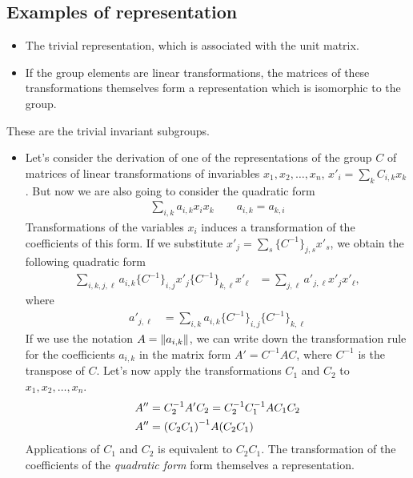 \subsection{Examples of representation} %
\label{sub:Examples of representation}

\begin{itemize}
    \item The trivial representation, which is associated with the unit matrix.
    \item If the group elements are linear transformations, the matrices of these
        transformations themselves form a representation which is isomorphic to
        the group.
\end{itemize}
These are the trivial invariant subgroups.

\begin{itemize}
    \item Let's consider the derivation of one of the representations of the group
        $C$ of matrices of linear transformations of invariables
        $x_1,x_2,\dots,x_n$, $x'_i=\sum_kC_{i,k}x_k$. But now we are also going
        to consider the quadratic form
        \begin{align}
            \sum_{i,k}a_{i,k}x_ix_k\qquad a_{i,k}=a_{k,i}
        \end{align}
        Transformations of the variables $x_i$ induces a transformation of the
        coefficients of this form. If we substitute
        $x'_j=\sum_s\{C^{-1}\}_{j,s}x'_s$, we obtain the following quadratic form
        \begin{align}
            \sum_{i,k,j,\ell}a_{i,k}\{C^{-1}\}_{i,j}x'_j\{C^{-1}\}_{k,\ell}x'_\ell
            &=\sum_{j,\ell}a'_{j,\ell}x'_jx'_\ell,
        \end{align}
        where
        \begin{align}
            a'_{j,\ell}&=\sum_{i,k}a_{i,k}\{C^{-1}\}_{i,j}\{C^{-1}\}_{k,\ell}
        \end{align}
        If we use the notation $A=\norm{a_{i,k}}$, we can write down the transformation
        rule for the coefficients $a_{i,k}$ in the matrix form $A'=C^{-1}AC$,
        where $C^{-1}$ is the transpose of $C$. Let's now apply the
        transformations $C_1$ and $C_2$ to $x_1,x_2,\dots,x_n$.
        \begin{align}
            A''&=C_2^{-1}A'C_2=C_2^{-1}C_1^{-1}AC_1C_2\\
            A''&=\qty(C_2C_1)^{-1}A\qty(C_2C_1)
        \end{align}
        Applications of $C_1$ and $C_2$ is equivalent to $C_2C_1$. The
        transformation of the coefficients of the \emph{quadratic form}
        form themselves a representation.
\end{itemize}

